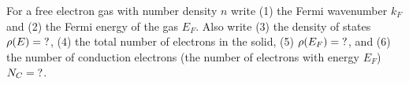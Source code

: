 

\vspace*{\fill}
\centering

For a free electron gas with number density $n$ write (1) the Fermi wavenumber $k_{F}$ and (2) the Fermi energy of the gas $E_{F}$. Also write (3) the density of states $\rho(E) = {\rm ?}$, (4) the total number of electrons in the solid, (5) $\rho(E_{F}) = {\rm ?}$, and (6) the number of conduction electrons (the number of electrons with energy $E_{F}$) $N_{C} = {\rm ?}$.

\centering
\vspace*{\fill}

